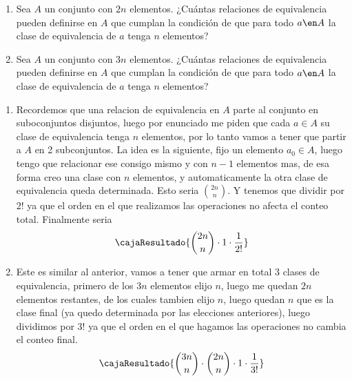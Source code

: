 \begin{enunciado}{\ejercicio}
  \begin{enumerate}[label=\alph*)]
    \item Sea $A$ un conjunto con $2n$ elementos. ¿Cuántas relaciones de equivalencia pueden definirse en $A$ que cumplan la condición
          de que para todo $a \en A$ la clase de equivalencia de $a$ tenga $n$ elementos?

    \item Sea $A$ un conjunto con $3n$ elementos. ¿Cuántas relaciones de equivalencia pueden definirse en $A$ que cumplan la condición
          de que para todo $a \en A$ la clase de equivalencia de $a$ tenga $n$ elementos?

  \end{enumerate}
\end{enunciado}

\begin{enumerate}[label=\alph*)]
 \item Recordemos que una relacion de equivalencia en $A$ parte al conjunto en suboconjuntos disjuntos, luego por 
 enunciado me piden que cada $a \in A$ su clase de equivalencia tenga $n$ elementos, por lo tanto vamos a tener que partir 
 a $A$ en 2 subconjuntos. La idea es la siguiente, fijo un elemento $a_0 \in A$, luego tengo que relacionar ese consigo mismo y con
 $n - 1$ elementos mas, de esa forma creo una clase con $n$ elementos, y automaticamente la otra clase de equivalencia queda determinada. 
 Esto seria $\binom{2n}{n}$. Y tenemos que dividir por $2!$ ya que el orden en el que realizamos las operaciones no afecta el conteo total. 
 Finalmente seria 
 $$
 \cajaResultado{\binom{2n}{n} \cdot 1 \cdot \frac{1}{2!}}
 $$

 \item Este es similar al anterior, vamos a tener que armar en total $3$ clases de equivalencia, primero de los $3n$ elementos elijo $n$, luego 
 me quedan $2n$ elementos restantes, de los cuales tambien elijo $n$, luego quedan $n$ que es la clase final (ya quedo determinada por las elecciones anteriores), luego 
 dividimos por $3!$ ya que el orden en el que hagamos las operaciones no cambia el conteo final. 
 $$
 \cajaResultado{\binom{3n}{n} \cdot \binom{2n}{n} \cdot 1 \cdot \frac{1}{3!}}
 $$
\end{enumerate}

\begin{aportes}
 \item {}
\end{aportes}
